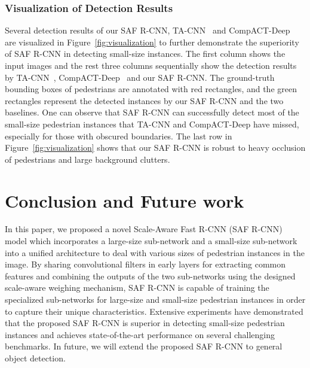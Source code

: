 \documentclass[journal]{IEEEtran}
\begin{document}
\subsubsection{Visualization of Detection Results}
Several detection results of our SAF R-CNN, TA-CNN~\cite{ta_cnn} and CompACT-Deep~\cite{compact} are visualized in Figure~\ref{fig:visualization} to further demonstrate the superiority of SAF R-CNN in detecting small-size instances. The first column shows the input images and the rest three columns sequentially show the detection results by TA-CNN~\cite{ta_cnn}, CompACT-Deep~\cite{compact} and our SAF R-CNN. The ground-truth bounding boxes of pedestrians are annotated with red rectangles, and the green rectangles represent the detected instances by our SAF R-CNN and the two baselines. One can observe that SAF R-CNN can successfully detect most of the small-size pedestrian instances that TA-CNN and CompACT-Deep have missed, especially for those with obscured boundaries. The last row in Figure~\ref{fig:visualization} shows that our SAF R-CNN is robust to heavy occlusion of pedestrians and large background clutters.

\section{Conclusion and Future work} 
In this paper, we proposed a novel Scale-Aware Fast R-CNN (SAF R-CNN) model which incorporates a large-size sub-network and a small-size sub-network into a unified architecture to deal with various sizes of pedestrian instances in the image.  By sharing convolutional filters in early layers for extracting common features and combining the outputs of the two sub-networks using the designed scale-aware weighing mechanism, SAF R-CNN is capable of training the specialized sub-networks for large-size and small-size pedestrian instances in order to capture their unique characteristics. Extensive experiments have demonstrated that the proposed SAF R-CNN is superior in detecting small-size pedestrian instances and achieves state-of-the-art performance on several challenging benchmarks. In future, we will extend the proposed SAF R-CNN to general object detection.

\vspace{-0.05in}

\scriptsize



\end{document}
